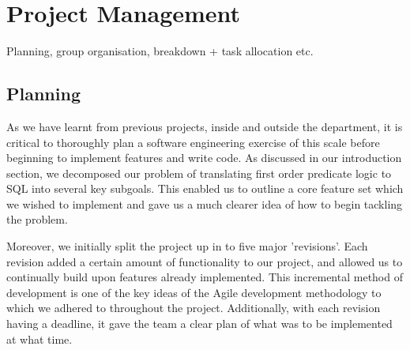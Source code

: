 \documentclass[a4paper, 11pt]{article}
\begin{document}
\section{Project Management}
  Planning, group organisation, breakdown + task allocation etc.

  \subsection{Planning}

    As we have learnt from previous projects, inside and outside the
    department, it is critical to thoroughly plan a software engineering
    exercise of this scale before beginning to implement features and write
    code. As discussed in our introduction section, we decomposed our problem
    of translating first order predicate logic to SQL into several key
    subgoals. This enabled us to outline a core feature set which we wished to
    implement and gave us a much clearer idea of how to begin tackling the
    problem.

    Moreover, we initially split the project up in to five major 'revisions'.
    Each revision added a certain amount of functionality to our project, and
    allowed us to continually build upon features already implemented. This
    incremental method of development is one of the key ideas of the Agile
    development methodology to which we adhered to throughout the project.
     Additionally, with each revision having a
    deadline, it gave the team a clear plan of what was to be implemented at
    what time.
\end{document}
